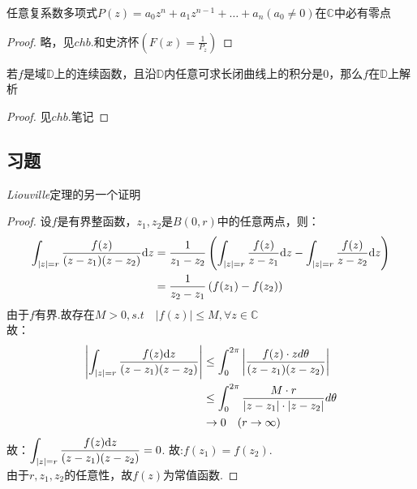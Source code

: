 \begin{mypro}[代数基本定理]
	任意复系数多项式$P(z)=a_{0}z^{n}+a_{1}z^{n-1}+\dots+a_{n}$\quad$(a_{0}\neq0)$在$\mathbb{C}$中必有零点
\end{mypro}
\begin{proof}
	略，见$chb.$和史济怀\quad$\displaystyle{(F(x)=\frac{1}{P_{z}})}$
\end{proof}

\begin{mypro}
	若$f$是域$\mathbb{D}$上的连续函数，且沿$\mathbb{D}$内任意可求长闭曲线上的积分是0，那么$f$在$\mathbb{D}$上解析
\end{mypro}
\begin{proof}
	见$chb.$笔记
\end{proof}

\subsection*{习题}
\begin{eg}
	\emph{Liouville}定理的另一个证明
\end{eg}
\begin{proof}
	设$f$是有界整函数，$z_{1},z_{2}$是$B(0,r)$中的任意两点，则：
	\begin{align*}
	\int_{|z|=r}\frac{f(z)}{(z-z_1)(z-z_2)}\mathrm{d}z
	&=\frac{1}{z_1-z_2}
	\left(\int_{|z|=r}\frac{f(z)}{z-z_1}\mathrm{d}z-\int_{|z|=r}\frac{f(z)}{z-z_2}\mathrm{d}z\right)\\
	&=\frac{1}{z_2-z_1}\left(f(z_1)-f(z_2)\right)
	\end{align*}
	由于$f$有界.故存在$M>0,s.t\quad|f(z)|\leq M,\forall z\in \mathbb{C}$\\
	故：
	\begin{align*}
	\left|\int_{|z|=r}\frac{f(z)\mathrm{d}z}{(z-z_1)(z-z_2)}\right|
	&\leq\int_0^{2\pi}\left|\frac{f(z)\cdot zd\theta}{(z-z_1)(z-z_2)}\right|\\
	&\leq\int_0^{2\pi}\frac{M\cdot r}{|z-z_1|\cdot|z-z_2|}d\theta\\
	&\rightarrow 0\quad(r\rightarrow\infty)
	\end{align*}
	故：$\displaystyle{\int_{|z|=r}\frac{f(z)\mathrm{d}z}{(z-z_1)(z-z_2)}=0}$. \quad 故:$\displaystyle{f(z_1)=f(z_2)}$.\\
	由于$r,z_1,z_2$的任意性，故$f(z)$为常值函数.
\end{proof}

